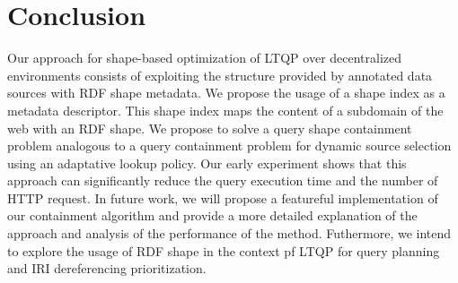 \section{Conclusion}
Our approach for shape-based optimization of LTQP over decentralized environments consists of exploiting the structure provided by
annotated data sources with RDF shape metadata. 
We propose the usage of a shape index as a metadata descriptor.
This shape index maps the content of a subdomain of the web with an RDF shape.
We propose to solve a query shape containment problem analogous to a query containment problem for dynamic source selection
using an adaptative lookup policy. 
Our early experiment shows that this approach can significantly reduce the query execution time and the number of HTTP request.
In future work, we will propose a featureful implementation of our containment algorithm and provide a more
detailed explanation of the approach and analysis of the performance of the method.
Futhermore, we intend to explore the usage of RDF shape in the context pf LTQP for query planning and IRI dereferencing prioritization.